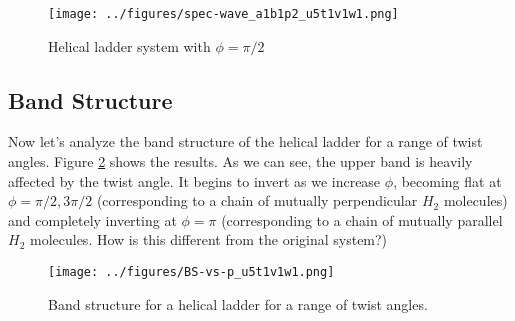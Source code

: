 \documentclass{article}
\begin{document}
\begin{figure}[h]
    \texttt{[image: ../figures/spec-wave\_a1b1p2\_u5t1v1w1.png]}
    \caption{Helical ladder system with $\phi = \pi/2$}
    \label{fig:helical-ladder-pi2}
\end{figure}

\subsection{Band Structure}
Now let's analyze the band structure of the helical ladder for a range of twist angles. Figure \ref{fig:helical-ladder-pi2-BS} shows the results. As we can see, the upper band is heavily affected by the twist angle. It begins to invert as we increase $\phi$, becoming flat at $\phi = \pi/2, 3\pi/2$ (corresponding to a chain of  mutually perpendicular $H_2$ molecules) and completely inverting at $\phi = \pi$ (corresponding to a chain of mutually parallel $H_2$ molecules. How is this different from the original system?)

\begin{figure}
    \centering
    \texttt{[image: ../figures/BS-vs-p\_u5t1v1w1.png]}
    \caption{Band structure for a helical ladder for a range of twist angles.}
    \label{fig:helical-ladder-pi2-BS}
\end{figure}
\end{document}
